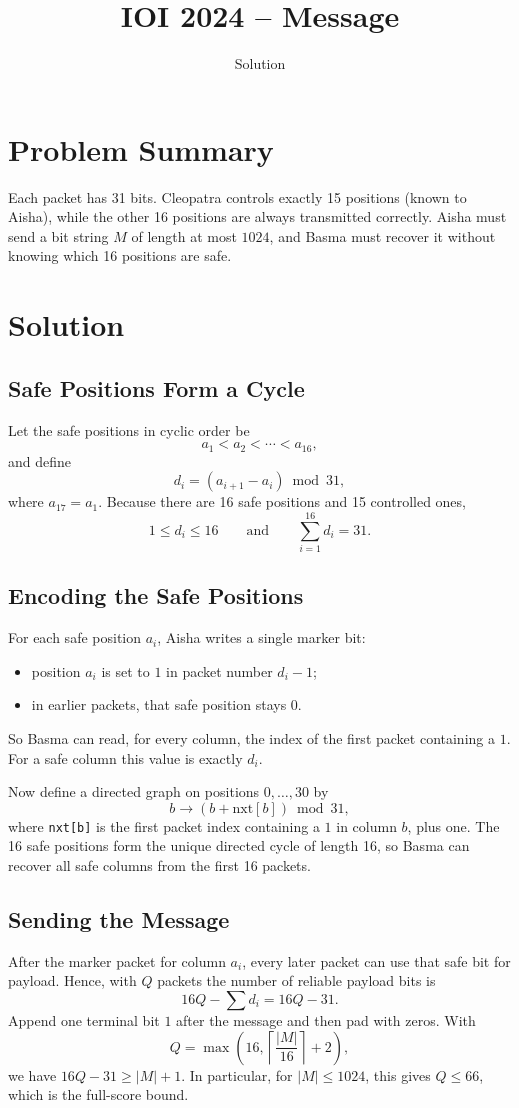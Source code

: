 \documentclass[11pt,a4paper]{article}
\title{IOI 2024 -- Message}
\author{Solution}
\date{}
\begin{document}
\maketitle

\section{Problem Summary}
Each packet has 31 bits. Cleopatra controls exactly 15 positions (known to Aisha), while the other 16 positions are always transmitted correctly. Aisha must send a bit string $M$ of length at most $1024$, and Basma must recover it without knowing which 16 positions are safe.

\section{Solution}

\subsection{Safe Positions Form a Cycle}
Let the safe positions in cyclic order be
\[
a_1 < a_2 < \cdots < a_{16},
\]
and define
\[
d_i = (a_{i+1} - a_i) \bmod 31,
\]
where $a_{17} = a_1$. Because there are 16 safe positions and 15 controlled ones,
\[
1 \le d_i \le 16
\qquad\text{and}\qquad
\sum_{i=1}^{16} d_i = 31.
\]

\subsection{Encoding the Safe Positions}
For each safe position $a_i$, Aisha writes a single marker bit:
\begin{itemize}
  \item position $a_i$ is set to $1$ in packet number $d_i - 1$;
  \item in earlier packets, that safe position stays $0$.
\end{itemize}
So Basma can read, for every column, the index of the first packet containing a $1$. For a safe column this value is exactly $d_i$.

Now define a directed graph on positions $0,\dots,30$ by
\[
b \to (b + \text{nxt}[b]) \bmod 31,
\]
where \texttt{nxt[b]} is the first packet index containing a $1$ in column $b$, plus one. The 16 safe positions form the unique directed cycle of length 16, so Basma can recover all safe columns from the first 16 packets.

\subsection{Sending the Message}
After the marker packet for column $a_i$, every later packet can use that safe bit for payload. Hence, with $Q$ packets the number of reliable payload bits is
\[
16Q - \sum d_i = 16Q - 31.
\]
Append one terminal bit $1$ after the message and then pad with zeros. With
\[
Q = \max\!\left(16, \left\lceil \frac{|M|}{16} \right\rceil + 2\right),
\]
we have $16Q - 31 \ge |M| + 1$. In particular, for $|M| \le 1024$, this gives $Q \le 66$, which is the full-score bound.
\end{document}
